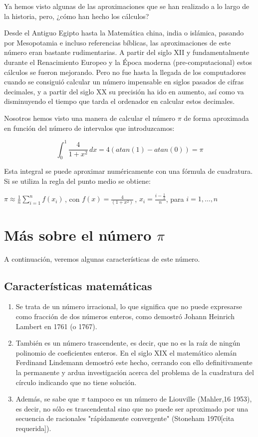 \documentclass[spanish,a4paper,10pt]{article}
\begin{document}
Ya hemos visto algunas de las aproximaciones que se han realizado a lo largo de la historia, pero, ¿cómo han hecho los cálculos?

Desde el Antiguo Egipto hasta la Matemática china, india o islámica, pasando por Mesopotamia e incluso referencias bíblicas, las aproximaciones de este número eran bastante rudimentarias. 
A partir del siglo XII y fundamentalmente durante el Renacimiento Europeo y la Época moderna (pre-computacional) estos cálculos se fueron mejorando.
Pero no fue hasta la llegada de los computadores cuando se consiguió calcular un número impensable en siglos pasados de cifras decimales, y a partir del siglo XX su precisión ha ido en aumento, así como va disminuyendo el tiempo que tarda el ordenador en calcular estos decimales.

Nosotros hemos visto una manera de calcular el número $\pi$ de forma aproximada en función del número de intervalos que introduzcamos: 

$$\int_{0}^{1} \! \frac{4}{1+x^2}\, dx = 4(atan(1) -atan(0)) = \pi $$

Esta integral se puede aproximar numéricamente con una fórmula de cuadratura.
%
Si se utiliza la regla del punto medio se obtiene:

\begin{center}
$ \pi \approx \frac{1}{n} \sum\limits_{i=1}^{n}f(x_i)\,$,
con $f(x) = \frac{4}{(1+x^2)}\,$,
$x_i = \frac{i - \frac{1}{2}}{n}$,
para $i = 1, \dots, n$
\end{center}

\pagebreak
\section{Más sobre el número $\pi$}

A continuación, veremos algunas características de este número.

\subsection{Características matemáticas}

\begin{enumerate}
  \item
    Se trata de un número irracional, lo que significa que no puede expresarse como fracción de dos números enteros, como demostró Johann Heinrich Lambert en 1761 (o 1767). 
    
   \item
    También es un número trascendente, es decir, que no es la raíz de ningún polinomio de coeficientes enteros. En el siglo XIX el matemático alemán Ferdinand Lindemann demostró este hecho, cerrando con ello definitivamente la permanente y ardua investigación acerca del problema de la cuadratura del círculo indicando que no tiene solución.

   \item
    Además, se sabe que $\pi$ tampoco es un número de Liouville (Mahler,16 1953), es decir, no sólo es trascendental sino que no puede ser aproximado por una secuencia de racionales "rápidamente convergente" (Stoneham 1970[cita requerida]).
\end{enumerate}
\end{document}
